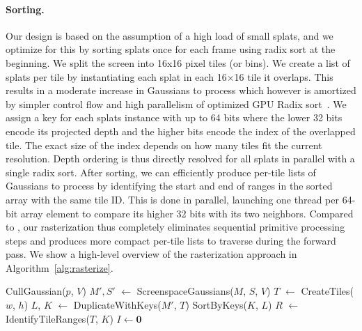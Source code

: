 \begin{appendix}
	\paragraph{Sorting.}
	Our design is based on the assumption of a high load of small splats, and we optimize for this by sorting splats once for each frame using radix sort at the beginning.
	We split the screen into 16x16 pixel tiles (or bins).  We create a list of splats per tile by instantiating each splat in each 16$\times$16 tile it overlaps. This results in a moderate increase in Gaussians to process 
	which however is amortized by simpler control flow and high parallelism of optimized GPU Radix sort~\cite{merrill2010revisiting}.
	We assign a key for each splats instance with up to 64 bits where the lower 32 bits encode its projected depth and the higher bits encode the index of the overlapped tile. The exact size of the index depends on how many tiles fit the current resolution. Depth ordering is thus directly resolved for all splats in parallel with a single radix sort. After sorting, we can efficiently produce per-tile lists of Gaussians to process by identifying the start and end of ranges in the sorted array with the same tile ID. This is done in parallel, launching one thread per 64-bit array element to compare its higher 32 bits with its two neighbors. 
	Compared to \cite{Lassner_2021_CVPR}, our rasterization thus completely eliminates sequential primitive processing steps and produces more compact per-tile lists to traverse during the forward pass.
	We show a high-level overview of the rasterization approach in Algorithm~\ref{alg:rasterize}.
	
	\begin{algorithm}
		\caption{GPU software rasterization of 3D Gaussians\\
			$w$, $h$: width and height of the image to rasterize\\
			$M$, $S$: Gaussian means and covariances in world space\\
			$C$, $A$: Gaussian colors and opacities\\
			$V$: view configuration of current camera}
		\label{alg:rasterize}
		\begin{algorithmic}
			
			
			
			\State CullGaussian($p$, $V$) 
			\State $M', S'$ $\gets$ ScreenspaceGaussians($M$, $S$, $V$) 
			\State $T$ $\gets$ CreateTiles($w$, $h$)
			\State $L$, $K$ $\gets$ DuplicateWithKeys($M'$, $T$) 
			\State SortByKeys($K$, $L$)							
			\State $R$ $\gets$ IdentifyTileRanges($T$, $K$)
			\State $I \gets \mathbf{0}$ 
			

\end{algorithmic}
\end{algorithm}
\end{appendix}
